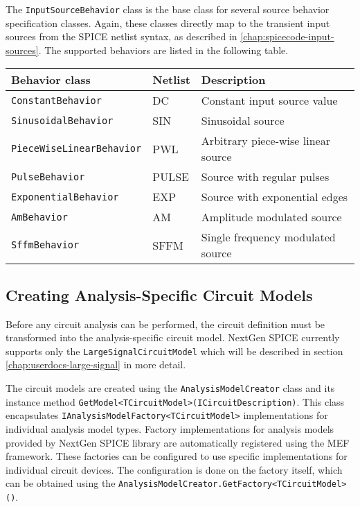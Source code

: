 The \texttt{InputSourceBehavior} class is the base class for several source behavior specification classes. Again, these classes directly map to the transient input sources from the SPICE netlist syntax, as described in \ref{chap:spicecode-input-sources}. The supported behaviors are listed in the following table.

\begin{center}
	\begin{tabular}{|l|l|l|}
		\hline
		Behavior class & Netlist & Description \\ \hline \hline
		\texttt{ConstantBehavior} & DC & Constant input source value \\ \hline
		\texttt{SinusoidalBehavior} & SIN & Sinusoidal source \\ \hline
		\texttt{PieceWiseLinearBehavior} & PWL & Arbitrary piece-wise linear source \\ \hline
		\texttt{PulseBehavior} & PULSE & Source with regular pulses  \\ \hline
		\texttt{ExponentialBehavior} & EXP & Source with exponential edges \\ \hline
		\texttt{AmBehavior} & AM & Amplitude modulated source \\ \hline
		\texttt{SffmBehavior} & SFFM & Single frequency modulated source \\ \hline
	\end{tabular}
\end{center}

\subsection{Creating Analysis-Specific Circuit Models}

Before any circuit analysis can be performed, the circuit definition must be transformed into the analysis-specific circuit model. NextGen SPICE currently supports only the \texttt{LargeSignalCircuitModel} which will be described in section \ref{chap:userdocs-large-signal} in more detail.

The circuit models are created using the \texttt{AnalysisModelCreator} class and its instance method \texttt{GetModel<TCircuitModel>(ICircuitDescription)}. This class encapsulates \texttt{IAnalysisModelFactory<TCircuitModel>} implementations for individual analysis model types. Factory implementations for analysis models provided by NextGen SPICE library are automatically registered using the MEF framework. These factories can be configured to use specific implementations for individual circuit devices. The configuration is done on the factory itself, which can be obtained using the \texttt{AnalysisModelCreator.GetFactory<TCircuit\+Model>()}.


